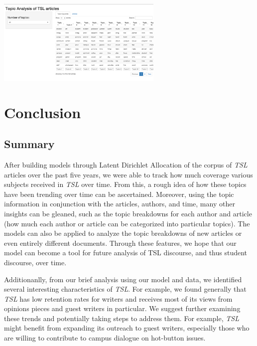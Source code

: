 \documentclass[a4paper]{article}
\begin{document}
\includegraphics[width=300px]{shinydemo.png}

\section{Conclusion}
\subsection{Summary}

After building models through Latent Dirichlet Allocation of the corpus of \textit{TSL} articles over the past five years, we were able to track how much coverage various subjects received in \textit{TSL} over time. From this, a rough idea of how these topics have been trending over time can be ascertained. Moreover, using the topic information in conjunction with the articles, authors, and time, many other insights can be gleaned, such as the topic breakdowns for each author and article (how much each author or article can be categorized into particular topics). The models can also be applied to analyze the topic breakdowns of new articles or even entirely different documents. Through these features, we hope that our model can become a tool for future analysis of TSL discourse, and thus student discourse, over time.

Additionanlly, from our brief analysis using our model and data, we identified several interesting characteristics of \textit{TSL}. For example, we found generally that \textit{TSL} has low retention rates for writers and receives most of its views from opinions pieces and guest writers in particular. We suggest further examining these trends and potentially taking steps to address them. For example, \textit{TSL} might benefit from expanding its outreach to guest writers, especially those who are willing to contribute to campus dialogue on hot-button issues.
\end{document}
